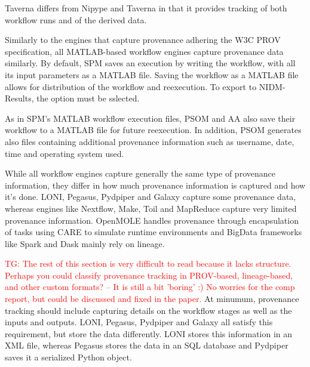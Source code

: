 \documentclass{report}
\newcommand{\tristan}[1]{\textcolor{red}{TG: #1}}
\begin{document}
            Taverna differs from Nipype and Taverna in that it provides 
            tracking of both workflow runs and of the derived data.

            Similarly to the engines that capture provenance adhering the
            W3C PROV specification, all MATLAB-based workflow engines capture
            provenance data similarly.
            By default, SPM saves an execution by writing the  workflow, with
            all its input parameters as a MATLAB file. Saving the workflow as
            a MATLAB file allows for distribution of the workflow and 
            reexecution. To export to NIDM-Results, the option must be 
            sslected.
            
            As in SPM's MATLAB workflow execution files, PSOM and AA 
            also save
            their workflow to a MATLAB file for future reexecution. 
            In addition, PSOM generates
            also files containing additional provenance information such 
            as username, date, time and operating system used.
            
            While all workflow engines capture generally the same type of 
            provenance information, they differ in how much provenance 
            information is captured and how it's done. LONI, Pegasus, Pydpiper 
            and Galaxy
            capture some provenance data, whereas engines 
            like Nextflow, Make, Toil and MapReduce capture very limited  
            provenance 
            information. OpenMOLE handles provenance through encapsulation of
            tasks using CARE to simulate runtime environments
            and BigData frameworks like Spark and Dask mainly rely on 
            lineage.

            \tristan{The rest of this section is very difficult to read because
            it lacks structure. Perhaps you could classify provenance tracking in PROV-based, lineage-based,
            and other custom formats? -- It is still a bit 'boring' :) No worries for the comp report,
            but could be discussed and fixed in the paper.}
            At minumum, provenance tracking should include 
            capturing details on the workflow stages as well as the inputs and
            outputs. LONI, Pegasus, Pydpiper and Galaxy all satisfy this 
            requirement, but store the data differently. LONI stores this 
            information in an XML file, whereas Pegasus stores the data in an 
            SQL database and Pydpiper saves it a serialized Python object.
\end{document}
